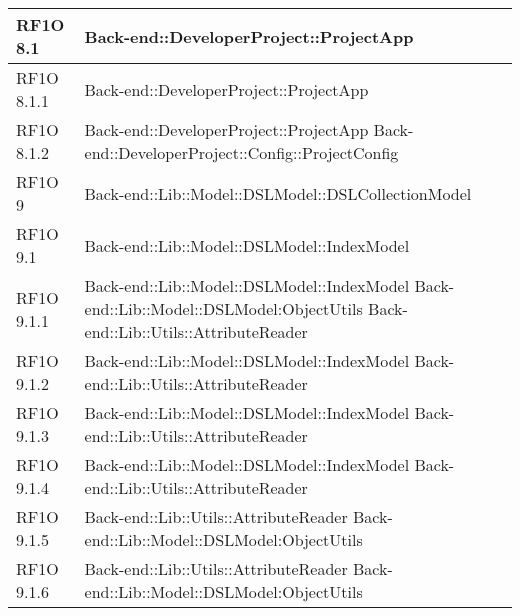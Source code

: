 \begin{center}
\begin{longtable}{ | p{3cm} | p{11cm} | }
    RF1O 8.1  & Back-end::DeveloperProject::ProjectApp \newline  \\ \hline  
        
    RF1O 8.1.1 & Back-end::DeveloperProject::ProjectApp \newline  \\ \hline      
    RF1O 8.1.2 & Back-end::DeveloperProject::ProjectApp \newline Back-end::DeveloperProject::Config::ProjectConfig \newline  \\ \hline        
           
    RF1O 9 & Back-end::Lib::Model::DSLModel::DSLCollectionModel\newline  \\ \hline      
    
    RF1O 9.1 & Back-end::Lib::Model::DSLModel::IndexModel \newline  \\ \hline   
       
    RF1O 9.1.1 & Back-end::Lib::Model::DSLModel::IndexModel \newline Back-end::Lib::Model::DSLModel:ObjectUtils \newline
    				Back-end::Lib::Utils::AttributeReader \\ \hline      
    
    RF1O 9.1.2 & Back-end::Lib::Model::DSLModel::IndexModel \newline Back-end::Lib::Utils::AttributeReader  \\ \hline      
    
    RF1O 9.1.3 &  Back-end::Lib::Model::DSLModel::IndexModel \newline Back-end::Lib::Utils::AttributeReader \\ \hline   
       
    RF1O 9.1.4 & Back-end::Lib::Model::DSLModel::IndexModel \newline Back-end::Lib::Utils::AttributeReader  \\ \hline 
         
    RF1O 9.1.5 & Back-end::Lib::Utils::AttributeReader \newline Back-end::Lib::Model::DSLModel:ObjectUtils \\ \hline      
    
    RF1O 9.1.6 & Back-end::Lib::Utils::AttributeReader \newline Back-end::Lib::Model::DSLModel:ObjectUtils \\ \hline      
    

\end{longtable}
\end{center}
